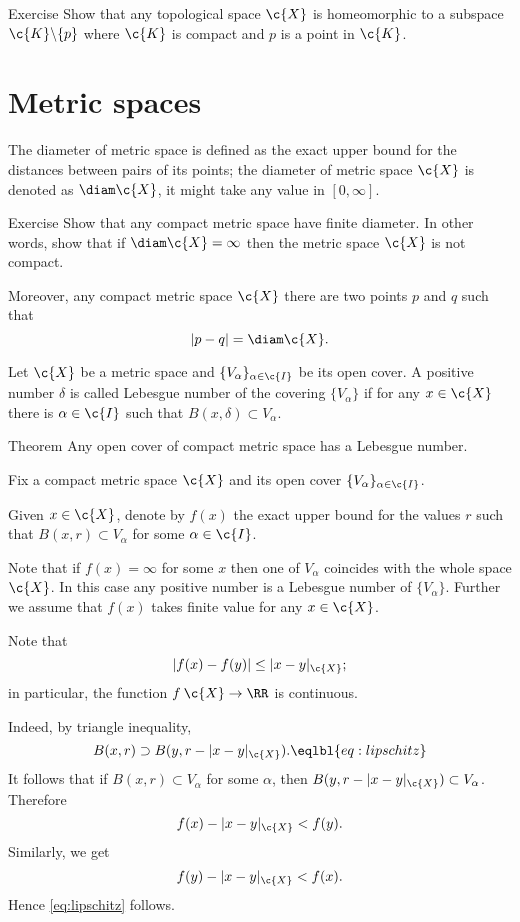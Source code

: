 \begin{thm}{Exercise}
Show that any topological space $\c{X}$ is homeomorphic to a subspace $\c{K}\backslash\{p\}$
where $\c{K}$ is compact and $p$ is a point in $\c{K}$.
\end{thm}

\section{Metric spaces}

The diameter of metric space is defined as the exact upper bound for the distances between pairs of its points;
the diameter of metric space $\c{X}$ is denoted as $\diam \c{X}$, it might take any value in $[0,\infty]$.

\begin{thm}{Exercise}
Show that any compact metric space have finite diameter.
In other words, show that if $\diam\c{X}=\infty$ then the metric space $\c{X}$ is not compact.

Moreover, any compact metric space $\c{X}$ there are two points $p$ and $q$ such that 
\[|p-q|=\diam \c{X}.\]
\end{thm}


Let $\c{X}$ be a metric space and $\{V_\alpha\}_{\alpha\in\c{I}}$ be its open cover.
A positive number $\delta$ is called Lebesgue number of the covering $\{V_\alpha\}$
if for any $x\in \c{X}$ there is $\alpha\in\c{I}$ such that $B(x,\delta)\subset V_\alpha$.

\begin{thm}{Theorem}
Any open cover of compact metric space has a Lebesgue number.
\end{thm}

Fix a compact metric space $\c{X}$ and its open cover $\{V_\alpha\}_{\alpha\in\c{I}}$.

Given $x\in \c{X}$, denote by $f(x)$ the exact upper bound for the values $r$ such that $B(x,r)\subset V_\alpha$ for some $\alpha\in \c{I}$.

Note that if $f(x)=\infty$ for some $x$ then one of $V_\alpha$ coincides with the whole space $\c{X}$.
In this case any positive number is a Lebesgue number of $\{V_\alpha\}$.
Further we assume that $f(x)$ takes finite value for any $x\in\c{X}$.

Note that 
\[|f(x)-f(y)|\le |x-y|_{\c{X}};\]
in particular, the function $f\:\c{X}\to\RR$ is continuous.

Indeed, by triangle inequality, 
\[B(x,r)\supset B(y,r-|x-y|_{\c{X}}).\eqlbl{eq:lipschitz}\]
It follows that if $B(x,r)\subset V_\alpha$ for some $\alpha$,
then $B(y,r-|x-y|_{\c{X}})\subset V_\alpha$.
Therefore
\[f(x)-|x-y|_{\c{X}}<f(y).\]
Similarly, we get 
\[f(y)-|x-y|_{\c{X}}<f(x).\]
Hence \ref{eq:lipschitz} follows.

